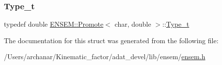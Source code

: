 \subsubsection{\texorpdfstring{Type\_t}{Type\_t}\hspace{0.1cm}{\footnotesize\ttfamily [2/2]}}
{\footnotesize\ttfamily typedef double \mbox{\hyperlink{structENSEM_1_1Promote}{E\+N\+S\+E\+M\+::\+Promote}}$<$ char, double $>$\+::\mbox{\hyperlink{structENSEM_1_1Promote_3_01char_00_01double_01_4_a2d74824409365a6005f55424a8314837}{Type\+\_\+t}}}



The documentation for this struct was generated from the following file\+:\begin{DoxyCompactItemize}
\item 
/\+Users/archanar/\+Kinematic\+\_\+factor/adat\+\_\+devel/lib/ensem/\mbox{\hyperlink{lib_2ensem_2ensem_8h}{ensem.\+h}}\end{DoxyCompactItemize}
